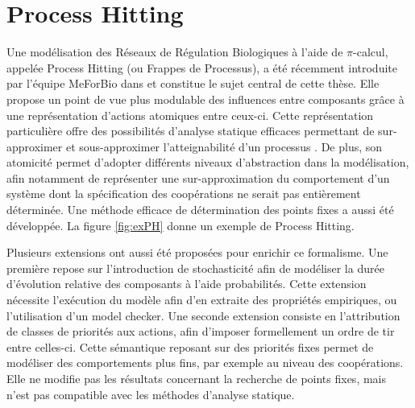 \section{Process Hitting}\label{sec:PH}
Une modélisation des Réseaux de Régulation Biologiques à l'aide de $\pi$-calcul, appelée Process Hitting (ou Frappes de Processus), a été récemment introduite par l'équipe MeForBio dans \cite{PMR10-TCSB,PaulevePhD} et constitue le sujet central de cette thèse.
Elle propose un point de vue plus modulable des influences entre composants grâce à une représentation d'actions atomiques entre ceux-ci.
Cette représentation particulière offre des possibilités d'analyse statique efficaces permettant de sur-approximer et sous-approximer l'atteignabilité d'un processus \cite{PMR12-MSCS}.
De plus, son atomicité permet d'adopter différents niveaux d'abstraction dans la modélisation, afin notamment de représenter une sur-approximation du comportement d'un système dont la spécification des coopérations ne serait pas entièrement déterminée.
Une méthode efficace de détermination des points fixes a aussi été développée.
La figure \ref{fig:exPH} donne un exemple de Process Hitting.

Plusieurs extensions ont aussi été proposées pour enrichir ce formalisme.
Une première repose sur l'introduction de stochasticité afin de modéliser la durée d'évolution relative des composants à l'aide probabilités.
Cette extension nécessite l'exécution du modèle afin d'en extraite des propriétés empiriques, ou l'utilisation d'un model checker.
Une seconde extension consiste en l'attribution de classes de priorités aux actions, afin d'imposer formellement un ordre de tir entre celles-ci.
Cette sémantique reposant sur des priorités fixes permet de modéliser des comportements plus fins, par exemple au niveau des coopérations.
Elle ne modifie pas les résultats concernant la recherche de points fixes, mais n'est pas compatible avec les méthodes d'analyse statique.

